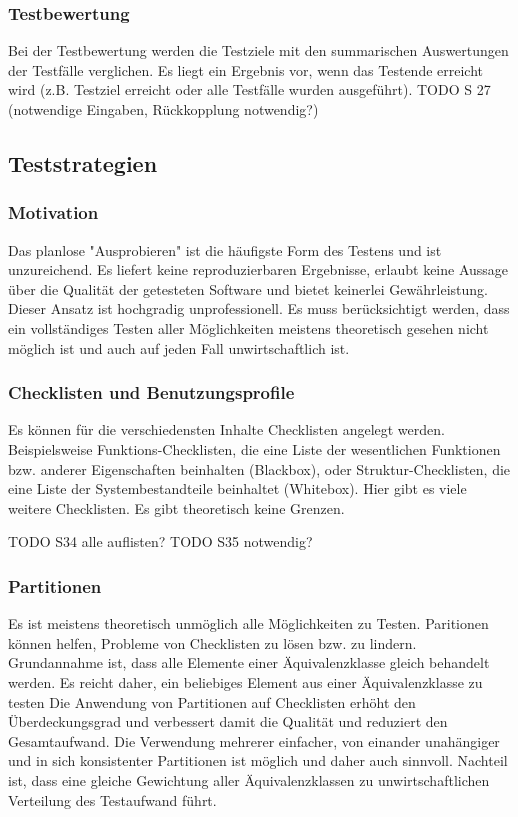 \subsubsection{Testbewertung}
Bei der Testbewertung werden die Testziele mit den summarischen Auswertungen der Testfälle verglichen. Es liegt ein Ergebnis vor, wenn das Testende erreicht wird (z.B. Testziel erreicht oder alle Testfälle wurden ausgeführt). 
TODO S 27 (notwendige Eingaben, Rückkopplung notwendig?)

\subsection{Teststrategien}
\subsubsection{Motivation}
Das planlose "Ausprobieren" ist die häufigste Form des Testens und ist unzureichend. Es liefert keine reproduzierbaren Ergebnisse, erlaubt keine Aussage über die Qualität der getesteten Software und bietet keinerlei Gewährleistung. Dieser Ansatz ist hochgradig unprofessionell. 
\linebreak
Es muss berücksichtigt werden, dass ein vollständiges Testen aller Möglichkeiten meistens theoretisch gesehen nicht möglich ist und auch auf jeden Fall unwirtschaftlich ist.

\subsubsection{Checklisten und Benutzungsprofile}
Es können für die verschiedensten Inhalte Checklisten angelegt werden. Beispielsweise Funktions-Checklisten, die eine Liste der wesentlichen Funktionen bzw. anderer Eigenschaften beinhalten (Blackbox), oder Struktur-Checklisten, die eine Liste der Systembestandteile beinhaltet (Whitebox). Hier gibt es viele weitere Checklisten. Es gibt theoretisch keine Grenzen.

TODO S34 alle auflisten?
TODO S35 notwendig?

\subsubsection{Partitionen}
Es ist meistens theoretisch unmöglich alle Möglichkeiten zu Testen. Paritionen können helfen, Probleme von Checklisten zu lösen  bzw. zu lindern.
\linebreak
Grundannahme ist, dass alle Elemente einer Äquivalenzklasse gleich behandelt werden. Es reicht daher, ein beliebiges Element aus einer Äquivalenzklasse zu testen
\linebreak
Die Anwendung von Partitionen auf Checklisten erhöht den Überdeckungsgrad und verbessert damit die Qualität und reduziert den Gesamtaufwand. 
\linebreak
Die Verwendung mehrerer einfacher, von einander unahängiger und in sich konsistenter Partitionen ist möglich und daher auch sinnvoll.
Nachteil ist, dass eine gleiche Gewichtung aller Äquivalenzklassen zu unwirtschaftlichen Verteilung des Testaufwand führt.

